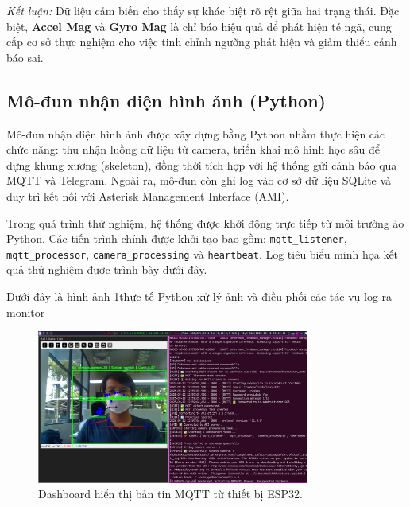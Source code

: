 \textit{Kết luận:} Dữ liệu cảm biến cho thấy sự khác biệt rõ rệt giữa hai trạng thái. Đặc biệt, \textbf{Accel Mag} và \textbf{Gyro Mag} là chỉ báo hiệu quả để phát hiện té ngã, cung cấp cơ sở thực nghiệm cho việc tinh chỉnh ngưỡng phát hiện và giảm thiểu cảnh báo sai.

\subsection{Mô-đun nhận diện hình ảnh (Python)}
\label{sec:python_vision}

Mô-đun nhận diện hình ảnh được xây dựng bằng Python nhằm thực hiện các chức năng: thu nhận luồng dữ liệu từ camera, triển khai mô hình học sâu để dựng khung xương (skeleton), đồng thời tích hợp với hệ thống gửi cảnh báo qua MQTT và Telegram. Ngoài ra, mô-đun còn ghi log vào cơ sở dữ liệu SQLite và duy trì kết nối với Asterisk Management Interface (AMI).  

Trong quá trình thử nghiệm, hệ thống được khởi động trực tiếp từ môi trường ảo Python. Các tiến trình chính được khởi tạo bao gồm: \texttt{mqtt\_listener}, \texttt{mqtt\_processor}, \texttt{camera\_processing} và \texttt{heartbeat}. Log tiêu biểu minh họa kết quả thử nghiệm được trình bày dưới đây.

Dưới đây là hình ảnh \ref{fig:python_runing_log}thực tế Python xử lý ảnh và điều phối các tác vụ log ra monitor
\begin{figure}[H]
    \centering
    \includegraphics[width=0.8\textwidth]{figures/python_runing_log.png}
    \caption{Dashboard hiển thị bản tin MQTT từ thiết bị ESP32.}
    \label{fig:python_runing_log}
\end{figure}

